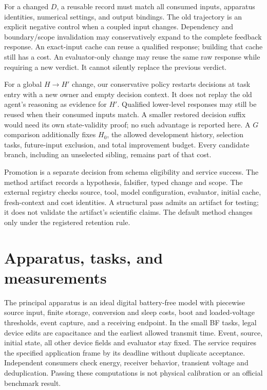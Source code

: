 For a changed $D$, a reusable record must match all consumed inputs, apparatus
identities, numerical settings, and output bindings. The old trajectory is an
explicit negative control when a coupled input changes. Dependency and
boundary/scope invalidation may conservatively expand to the complete feedback
response. An exact-input cache can reuse a qualified response; building that
cache still has a cost. An evaluator-only change may reuse the same raw response
while requiring a new verdict. It cannot silently replace the previous verdict.

For a global $H\rightarrow H'$ change, our conservative policy restarts decisions
at task entry with a new owner and empty decision context. It does not replay
the old agent's reasoning as evidence for $H'$. Qualified lower-level responses
may still be reused when their consumed inputs match. A smaller restored decision
suffix would need its own state-validity proof; no such advantage is reported
here. A $G$ comparison additionally fixes $H_0$, the allowed development history,
selection tasks, future-input exclusion, and total improvement budget. Every
candidate branch, including an unselected sibling, remains part of that cost.

Promotion is a separate decision from schema eligibility and service success.
The method artifact records a hypothesis, falsifier, typed change and scope.
The external registry checks source, tool, model configuration, evaluator,
initial cache, fresh-context and cost identities. A structural pass admits an
artifact for testing; it does not validate the artifact's scientific claims.
The default method changes only under the registered retention rule.

\section{Apparatus, tasks, and measurements}
The principal apparatus is an ideal digital battery-free model with piecewise
source input, finite storage, conversion and sleep costs, boot and loaded-voltage
thresholds, event capture, and a receiving endpoint. In the small BF tasks, legal
device edits are capacitance and the earliest allowed transmit time. Event,
source, initial state, all other device fields and evaluator stay fixed. The
service requires the specified application frame by its deadline without
duplicate acceptance. Independent consumers check energy, receiver behavior,
transient voltage and deduplication. Passing these computations is not physical
calibration or an official benchmark result.

